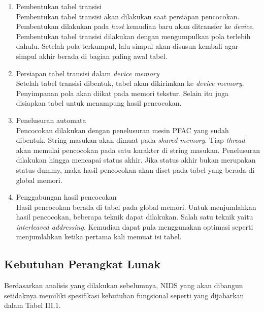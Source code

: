      \begin{enumerate}

      \item
      Pembentukan tabel transisi \\
      Pembentukan tabel transisi akan dilakukan saat persiapan pencocokan. Pembentukan dilakukan pada \emph{host} kemudian baru akan ditransfer ke \emph{device}. Pembentukan tabel transisi dilakukan dengan mengumpulkan pola terlebih dahulu. Setelah pola terkumpul, lalu simpul akan disusun kembali agar simpul akhir berada di bagian paling awal tabel. 

      \item
      Persiapan tabel transisi dalam \emph{device memory} \\
      Setelah tabel transisi dibentuk, tabel akan dikirimkan ke \emph{device memory}. Penyimpanan pola akan diikat pada memori tekstur. Selain itu juga disiapkan tabel untuk menampung hasil pencocokan.

      \item
      Penelusuran automata \\
      Pencocokan dilakukan dengan penelusuran mesin PFAC yang sudah dibentuk. String masukan akan dimuat pada \emph{shared memory}. Tiap \emph{thread} akan memulai pencocokan pada satu karakter di string masukan. Penelusuran dilakukan hingga mencapai status akhir. Jika status akhir bukan merupakan status dummy, maka hasil pencocokan akan diset pada tabel yang berada di global memori.

      \item
      Penggabungan hasil pencocokan \\
      Hasil pencocokan berada di tabel pada global memori. Untuk menjumlahkan hasil pencocokan, beberapa teknik dapat dilakukan. Salah satu teknik yaitu \emph{interleaved addressing}. Kemudian dapat pula menggunakan optimasi seperti menjumlahkan ketika pertama kali memuat isi tabel. 

      \end{enumerate}

    \subsection{Kebutuhan Perangkat Lunak}

      Berdasarkan analisis yang dilakukan sebelumnya, NIDS yang akan dibangun setidaknya memiliki spesifikasi kebutuhan fungsional seperti yang dijabarkan dalam Tabel III.1.
      
      


